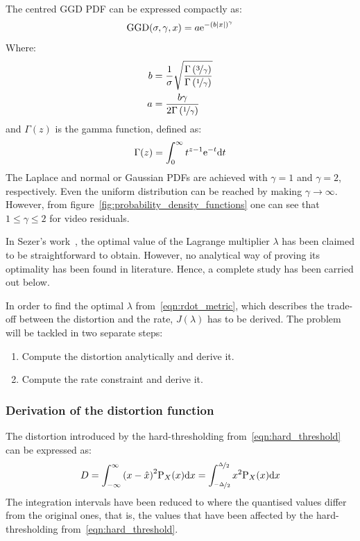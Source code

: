 \documentclass[11pt,a4paper,openright,twoside]{book}
\numberwithin{equation}{section} %
\numberwithin{figure}{section} %
\numberwithin{table}{section} %
\begin{document}
The centred \ac{GGD} \ac{PDF} can be expressed compactly as:
\begin{equation}
	\text{GGD}(\sigma,\gamma,x)=
	a\text{e}^{-{\left(b\vert x \vert\right)}^\gamma}
	\label{eqn:ggd}
\end{equation}
Where:
\begin{align}
	b &= \frac{1}{\sigma}\sqrt{
	\frac{\Gamma\left(\nicefrac{3}{\gamma}\right)}
	{\Gamma \left(\nicefrac{1}{\gamma}\right)}} \\
	a &= \frac{b\gamma}{2\Gamma \left(\nicefrac{1}{\gamma}\right)}
\end{align}
and $\Gamma(z)$ is the gamma function, defined as:
\begin{equation}
	\Gamma(z) = \int_0^\infty t^{z-1}\text{e}^{-t}\text{d} t
\end{equation}
The Laplace and normal or Gaussian \acp{PDF} are achieved with
$\gamma=1$ and $\gamma=2$, respectively.
Even the uniform distribution can be reached by making $\gamma\to\infty$.
However, from figure~\ref{fig:probability_density_functions} one can see
that $1\le\gamma\le2$ for video residuals.

In Sezer's work~\cite{sezer-11-phd,sezer-08-sparse-orthonormal-transforms},
the optimal value of the Lagrange multiplier $\lambda$ has been claimed
to be straightforward to obtain.
However, no analytical way of proving its optimality has been found in
literature.
Hence, a complete study has been carried out below.

In order to find the optimal $\lambda$ from~\eqref{eqn:rdot_metric},
which describes the trade-off between the distortion and the rate,
$J(\lambda)$ has to be derived.
The problem will be tackled in two separate steps:
\begin{enumerate}
	\item Compute the distortion analytically and derive it.
	\item Compute the rate constraint and derive it.
\end{enumerate}

\subsubsection{Derivation of the distortion function}
\label{ssub:derivation_of_the_distortion_function}

The distortion introduced by the hard-thresholding
from~\eqref{eqn:hard_threshold} can be expressed as:
\begin{equation}
	D
	= \int_{-\infty}^{\infty} {(x - \hat x)}^2 \text{P}_X (x)\text{d} x
	= \int_{\nicefrac{-\Delta}{2}}^{\nicefrac{\Delta}{2}}
	\label{eqn:int_distortion}
	x^2\text{P}_X (x) \text{d} x
\end{equation}
The integration intervals have been reduced to where the quantised values
differ from the original ones, that is, the values that have been affected by
the hard-thresholding from~\eqref{eqn:hard_threshold}.
\end{document}
